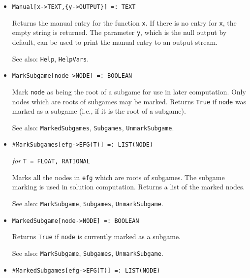\begin{itemize}

\item
\protect \large \begin{verbatim}
Manual[x->TEXT,{y->OUTPUT}] =: TEXT
\end{verbatim} \normalsize

\bd 
Returns the manual entry for the function \verb+x+.  If there is no
entry for \verb+x+, the empty string is returned. The parameter
\verb+y+, which is the null output by default, can be used to print
the manual entry to an output stream.
\item [See also:] \verb+Help+, \verb+HelpVars+.
\ed

\item
\protect \large \begin{verbatim}
MarkSubgame[node->NODE] =: BOOLEAN
\end{verbatim} \normalsize

\bd
Mark \verb+node+ as being the root of a subgame for use in later computation.
Only nodes which are roots of subgames may be marked.  Returns \verb+True+
if \verb+node+ was marked as a subgame (i.e., if it is the root of a subgame).
\item [See also:] \verb+MarkedSubgames+, \verb+Subgames+,
\verb+UnmarkSubgame+.
\ed


\item
\protect \large \begin{verbatim}
#MarkSubgames[efg->EFG(T)] =: LIST(NODE)
\end{verbatim} \normalsize

{\it for} {\tt T = FLOAT, RATIONAL} 

\bd 
Marks all the nodes in \verb+efg+ which are roots of subgames.  The
subgame marking is used in solution computation. Returns a list of the
marked nodes. 
\item [See also:] \verb+MarkSubgame+, \verb+Subgames+, \verb+UnmarkSubgame+.
\ed

\item
\protect \large \begin{verbatim}
MarkedSubgame[node->NODE] =: BOOLEAN
\end{verbatim} \normalsize

\bd
Returns \verb+True+ if \verb+node+ is currently marked as a subgame. 
\item [See also:] \verb+MarkSubgame+, \verb+Subgames+, \verb+UnmarkSubgame+.
\ed

\item
\protect \large \begin{verbatim}
#MarkedSubgames[efg->EFG(T)] =: LIST(NODE)
\end{verbatim} \normalsize


\end{itemize}
